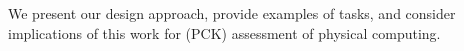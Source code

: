 We present our design approach, provide examples of tasks, and consider implications of this work for (PCK) assessment of physical computing.


%
%
%
%
%
%
%
%















